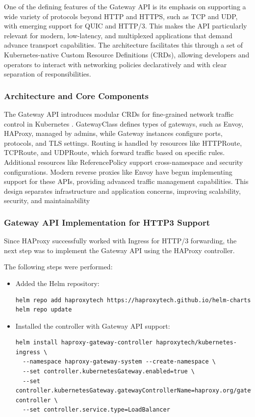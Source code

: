 One of the defining features of the Gateway API is its emphasis on supporting a wide variety of protocols beyond HTTP and HTTPS, such as TCP and UDP, with emerging support for QUIC and HTTP/3. This makes the API particularly relevant for modern, low-latency, and multiplexed applications that demand advance transport capabilities. The architecture facilitates this through a set of Kubernetes-native Custom Resource Definitions (CRDs), allowing developers and operators to interact with networking policies declaratively and with clear separation of responsibilities.


\subsubsection{Architecture and Core Components}
The Gateway API introduces modular CRDs for fine-grained network traffic control in Kubernetes \cite{gateway-api}. GatewayClass defines types of gateways, such as Envoy, HAProxy, managed by admins, while Gateway instances configure ports, protocols, and TLS settings. Routing is handled by resources like HTTPRoute, TCPRoute, and UDPRoute, which forward traffic based on specific rules. Additional resources like ReferencePolicy support cross-namespace and security configurations. Modern reverse proxies like Envoy \cite{envoy-proxy} have begun implementing support for these APIs, providing advanced traffic management capabilities. This design separates infrastructure and application concerns, improving scalability, security, and maintainability


\subsubsection{Gateway API Implementation for HTTP3 Support}

Since HAProxy successfully worked with Ingress for HTTP/3 forwarding, the next step was to implement the Gateway API using the HAProxy controller.


The following steps were performed:

\begin{itemize}
  \item Added the Helm repository:
\begin{lstlisting}[breaklines=true,basicstyle=\small\ttfamily,frame=single]
helm repo add haproxytech https://haproxytech.github.io/helm-charts
helm repo update
\end{lstlisting}

  \item Installed the controller with Gateway API support:
\begin{lstlisting}[breaklines=true,basicstyle=\small\ttfamily,frame=single]
helm install haproxy-gateway-controller haproxytech/kubernetes-ingress \
  --namespace haproxy-gateway-system --create-namespace \
  --set controller.kubernetesGateway.enabled=true \
  --set controller.kubernetesGateway.gatewayControllerName=haproxy.org/gateway-controller \
  --set controller.service.type=LoadBalancer
\end{lstlisting}
\end{itemize}

